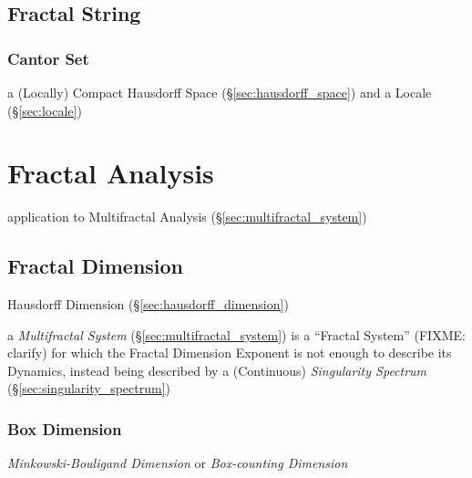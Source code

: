 \subsection{Fractal String}\label{sec:fractal_string}

\subsubsection{Cantor Set}\label{sec:cantor_set}

a (Locally) Compact Hausdorff Space (\S\ref{sec:hausdorff_space}) and a Locale
(\S\ref{sec:locale})



\section{Fractal Analysis}\label{sec:fractal_analysis}

application to Multifractal Analysis (\S\ref{sec:multifractal_system})



\subsection{Fractal Dimension}\label{sec:fractal_dimension}

Hausdorff Dimension (\S\ref{sec:hausdorff_dimension})

\fist a \emph{Multifractal System} (\S\ref{sec:multifractal_system}) is a
``Fractal System'' (FIXME: clarify) for which the Fractal Dimension Exponent is
not enough to describe its Dynamics, instead being described by a (Continuous)
\emph{Singularity Spectrum} (\S\ref{sec:singularity_spectrum})



\subsubsection{Box Dimension}\label{sec:box_dimension}

\emph{Minkowski-Bouligand Dimension} or \emph{Box-counting Dimension}



